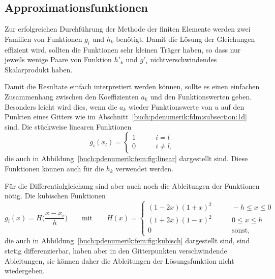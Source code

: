 %
%
\subsection{Approximationsfunktionen}
Zur erfolgreichen Durchführung der Methode der finiten Elemente
werden zwei Familien von Funktionen $g_i$ und $h_k$ benötigt.
Damit die Lösung der Gleichungen effizient wird, sollten die 
Funktionen sehr kleinen Träger haben, so dass nur jeweils wenige
Paare von Funktion $h'_k$ und $g'_i$ nichtverschwindendes Skalarprodukt
haben.

Damit die Resultate einfach interpretiert werden können, sollte es
einen einfachen Zusammenhang zwischen den Koeffizienten $a_k$ und
den Funktionswerten geben.
Besonders leicht wird dies, wenn die $a_k$ wieder Funktionswerte
von $u$ auf den Punkten eines Gitters wie im
Abschnitt~\ref{buch:pdenumerik:fdm:subsection:1d} sind.
%
Die stückweise linearen Funktionen
\[
g_i(x_l) = \begin{cases}
1&\qquad i=l \\
0&\qquad i\ne l,
\end{cases}
\]
die auch in Abbildung~\ref{buch:pdenumerik:fem:fig:linear}
dargestellt sind.
Diese Funktionen können auch für die $h_k$ verwendet werden.

Für die Differentialgleichung sind aber auch noch die 
Ableitungen der Funktionen nötig.
%
Die kubischen Funktionen 
\[
g_i(x)
=
H\biggl(\frac{x-x_i}{h}\biggr)
\qquad\text{mit} \qquad
H(x)
=
\begin{cases}
(1-2x)(1+x)^2    &\qquad -h\le x \le 0\\
(1+2x)(1-x)^2    &\qquad 0\le x \le h\\
0                &\qquad\text{sonst,}
\end{cases}
\]
die auch in Abbildung~\ref{buch:pdenumerik:fem:fig:kubisch}
dargestellt sind, sind stetig differenzierbar, haben aber
in den Gitterpunkten verschwindende Ableitungen, sie können daher
die Ableitungen der Lösungsfunktion nicht wiedergeben.

